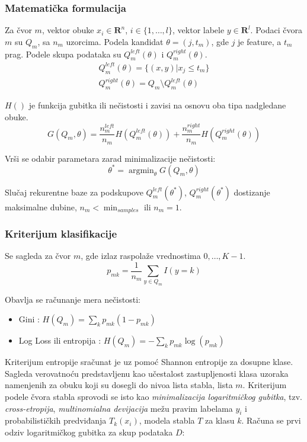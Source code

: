 \documentclass[fontsize=12bp, paper=a4]{scrarticle}
\begin{document}
\subsubsection{Matematička formulacija}
Za čvor $m$, vektor obuke $x_i \in \mathbf{R}^n$, $i \in \{1,\dots,l\}$, vektor labele $y\in\mathbf{R}^l$. Podaci čvora $m$ su $Q_m$, sa $n_m$ uzorcima. Podela kandidat $\theta = (j, t_m)$, gde $j$ je feature, a $t_m$ prag. Podele skupa podataka su $Q_m^{left}(\theta)$ i $Q_m^{right}(\theta)$.
$$\begin{aligned}Q_m^{left}(\theta) = \{(x, y) | x_j \leq t_m\}\\Q_m^{right}(\theta) = Q_m \setminus Q_m^{left}(\theta)\end{aligned}$$

$H()$ je funkcija gubitka ili nečistosti i zavisi na osnovu oba tipa nadgledane obuke. 
$$G(Q_m, \theta) = \frac{n_m^{left}}{n_m} H(Q_m^{left}(\theta)) + \frac{n_m^{right}}{n_m} H(Q_m^{right}(\theta))$$

Vrši se odabir parametara zarad minimalizacije nečistosti:
$$\theta^* = \operatorname{argmin}_\theta  G(Q_m, \theta)$$

Slučaj rekurentne baze za podskupove $Q_m^{left}(\theta^*)$, $Q_m^{right}(\theta^*)$ dostizanje maksimalne dubine, $n_m < \min_{samples}$ ili $n_m = 1$.

\subsubsection{Kriterijum klasifikacije}
Se sagleda za čvor $m$, gde izlaz raspolaže vrednostima $0,\dots,K-1$.
$$p_{mk} = \frac{1}{n_m} \sum_{y \in Q_m} I(y = k)$$

Obavlja se računanje mera nečistosti:
\begin{itemize}
    \item Gini : $H(Q_m) = \sum_k p_{mk} (1 - p_{mk})$
    \item Log Loss ili entropija : $H(Q_m) = - \sum_k p_{mk} \log(p_{mk})$
\end{itemize}

Kriterijum entropije sračunat je uz pomoć Shannon entropije za dosupne klase. Sagleda verovatnoću predstavljenu kao učestalost zastupljenosti klasa uzoraka namenjenih za obuku koji su dosegli do nivoa lista stabla, lista $m$.
Kriterijum podele čvora stabla sprovodi se isto kao \textit{minimalizacija logaritmičkog gubitka}, tzv. \textit{cross-etropija}, \textit{multinomialna devijacija} mežu pravim labelama $y_i$ i probabilističkih predviđanja $T_k(x_i)$, modela stabla $T$ za klasu $k$. Računa se prvi odziv logaritmičkog gubitka za skup podataka $D$:
\end{document}
